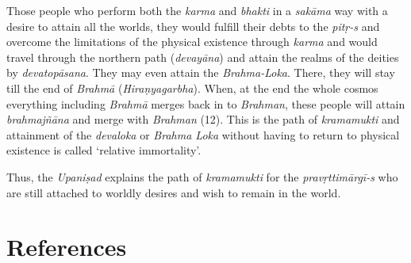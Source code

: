 Those people who perform both the \emph{karma} and \emph{bhakti} in a \emph{sakāma} way with a desire to attain all the worlds, they would fulfill their debts to the \emph{pitṛ-s} and overcome the limitations of the physical existence through \emph{karma} and would travel through the northern path (\emph{devayāna}) and attain the realms of the deities by \emph{devatopāsana}. They may even attain the \emph{Brahma-Loka}. There, they will stay till the end of \emph{Brahmā} (\emph{Hiraṇyagarbha}). When, at the end the whole cosmos everything including \emph{Brahmā} merges back in to \emph{Brahman}, these people will attain \emph{brahmajñāna} and merge with \emph{Brahman} (12). This is the path of \emph{kramamukti} and attainment of the \emph{devaloka} or \emph{Brahma Loka} without having to return to physical existence is called `relative immortality'.

Thus, the \emph{Upaniṣad} explains the path of \emph{kramamukti} for the \emph{pravṛtti\-mārgī-s} who are still attached to worldly desires and wish to remain in the world.

\section*{References}

